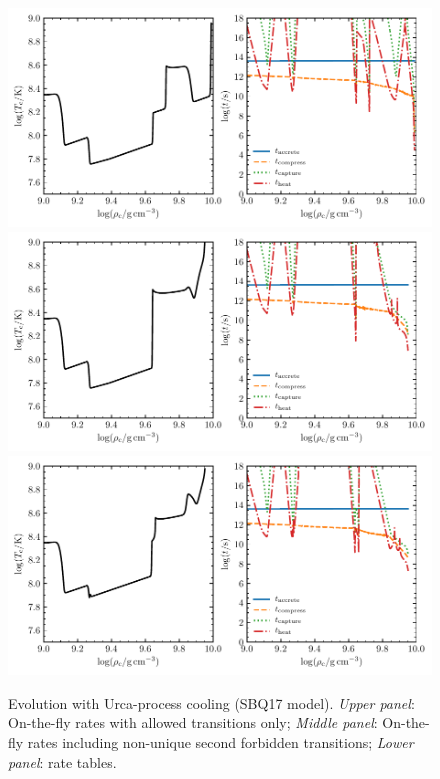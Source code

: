 \documentclass[modern]{aastex62}
\begin{document}
\begin{figure}
  \centering
  \includegraphics[width=\textwidth]{SBQ17-allowed.pdf}
  \includegraphics[width=\textwidth]{SBQ17-nusf11.pdf}
  \includegraphics[width=\textwidth]{SBQ17-suzuki.pdf}
  \caption{Evolution with Urca-process cooling (SBQ17 model). \textit{Upper panel}: On-the-fly rates with allowed transitions only;  \textit{Middle panel}: On-the-fly rates including non-unique second forbidden transitions; \textit{Lower panel}: \citet{Suzuki2016a} rate tables.}
\end{figure}
\end{document}
